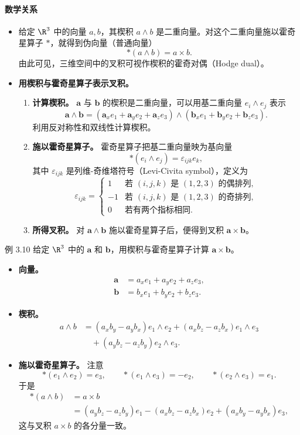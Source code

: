 \paragraph{数学关系}
\begin{itemize}
\item 给定 $\R^3$ 中的向量 $a,b$，其楔积 $a\wedge b$ 是二重向量。对这个二重向量施以霍奇星算子 $*$，就得到伪向量（普通向量）
\[
  *(a\wedge b)=a\times b.
\]
由此可见，三维空间中的叉积可视作楔积的霍奇对偶（Hodge dual）。
\item \textbf{用楔积与霍奇星算子表示叉积。}
\begin{enumerate}
\item \textbf{计算楔积。}
$\symbf{a}$ 与 $\symbf{b}$ 的楔积是二重向量，可以用基二重向量 $e_i\wedge e_j$ 表示
\[
  \symbf{a}\wedge\symbf{b}=(\symbf{a}_xe_1+\symbf{a}_ye_2+\symbf{a}_ze_3)
    \wedge(\symbf{b}_xe_1+\symbf{b}_ye_2+\symbf{b}_ze_3).
\]
利用反对称性和双线性计算楔积。
\item \textbf{施以霍奇星算子。}
霍奇星算子把基二重向量映为基向量
\[
  *(e_i\wedge e_j)=\varepsilon_{ijk}e_k,
\]
其中 $\varepsilon_{ijk}$ 是列维-奇维塔符号（Levi-Civita symbol），定义为
\[
  \varepsilon_{ijk}=
  \begin{cases}
     1 & \text{若 $(i,j,k)$ 是 $(1,2,3)$ 的偶排列},\\
    -1 & \text{若 $(i,j,k)$ 是 $(1,2,3)$ 的奇排列},\\
     0 & \text{若有两个指标相同}.
  \end{cases}
\]
\item \textbf{所得叉积。}
对 $\symbf{a}\wedge\symbf{b}$ 施以霍奇星算子后，便得到叉积 $\symbf{a}\times\symbf{b}$。
\end{enumerate}
\end{itemize}

\begin{statement}{例 3.10}{}
给定 $\R^3$ 中的 $\symbf{a}$ 和 $\symbf{b}$，用楔积与霍奇星算子计算 $\symbf{a}\times\symbf{b}$。
\begin{itemize}
\item \textbf{向量。}
\begin{align*}
  \symbf{a}&=a_xe_1+a_ye_2+a_ze_3,\\
  \symbf{b}&=b_xe_1+b_ye_2+b_ze_3.
\end{align*}
\item \textbf{楔积。}
\begin{align*}
 a\wedge b&=(a_xb_y-a_yb_x)e_1\wedge e_2+(a_xb_z-a_zb_x)e_1\wedge e_3\\
   &\quad+(a_yb_z-a_zb_y)e_2\wedge e_3.
\end{align*}
\item \textbf{施以霍奇星算子。}
注意
\[
 *(e_1\wedge e_2)=e_3,\qquad
 *(e_1\wedge e_3)=-e_2,\qquad
 *(e_2\wedge e_3)=e_1.
\]
于是
\begin{align*}
 *(a\wedge b)&=a\times b\\
  &=(a_yb_z-a_zb_y)e_1-(a_xb_z-a_zb_x)e_2+(a_xb_y-a_yb_x)e_3,
\end{align*}
这与叉积 $a\times b$ 的各分量一致。
\end{itemize}
\end{statement}

